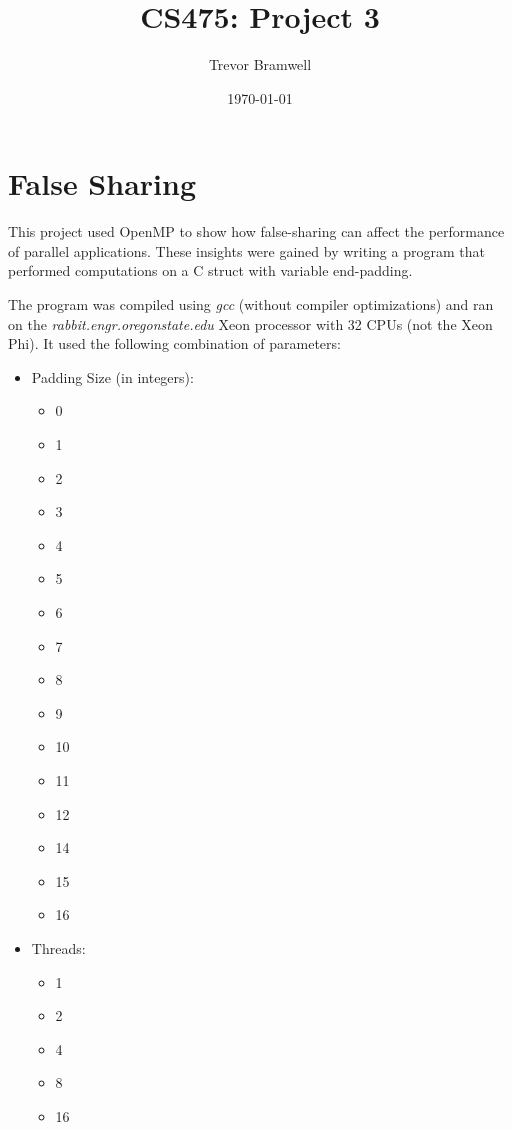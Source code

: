 \documentclass[12pt]{article}
\title{CS475: Project 3}
\author{Trevor Bramwell}
\date{\today}
\begin{document}
\maketitle

\section*{False Sharing}

This project used OpenMP to show how false-sharing can affect the
performance of parallel applications. These insights were gained by
writing a program that performed computations on a C struct with
variable end-padding.

The program was compiled using \emph{gcc} (without compiler
optimizations) and ran on the \emph{rabbit.engr.oregonstate.edu} Xeon
processor with 32 CPUs (not the Xeon Phi). It used the following combination
of parameters:

\begin{itemize}
    \item Padding Size (in integers):
        \begin{multicols}{2}
            \begin{itemize}
                \item 0
                \item 1
                \item 2
                \item 3
                \item 4
                \item 5
                \item 6
                \item 7
                \item 8
                \item 9
                \item 10
                \item 11
                \item 12
                \item 14
                \item 15
                \item 16
            \end{itemize}
        \end{multicols}
    \item Threads:
        \begin{multicols}{2}
            \begin{itemize}
                \item 1
                \item 2
                \item 4
                \item 8
                \item 16
            \end{itemize}
        \end{multicols}
\end{itemize}
\end{document}
